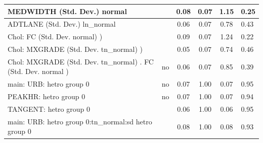 \begin{table}
\begin{center}
\begin{tabular}{|l|l|c|c|c|l|}
			\hline
			MEDWIDTH (Std. Dev.) normal &  & 0.08 & 0.07 & 1.15 & 0.25 \\
			\hline
			ADTLANE (Std. Dev.) ln_normal &  & 0.06 & 0.07 & 0.78 & 0.43 \\
			\hline
			 Chol: FC (Std. Dev. normal) ) &  & 0.09 & 0.07 & 1.24 & 0.22 \\
			\hline
			 Chol: MXGRADE (Std. Dev. tn_normal) ) &  & 0.05 & 0.07 & 0.74 & 0.46 \\
			\hline
			 Chol: MXGRADE (Std. Dev. tn_normal) . FC (Std. Dev.   normal ) & no & 0.06 & 0.07 & 0.85 & 0.39 \\
			\hline
			main: URB: hetro group 0 & no & 0.07 & 1.00 & 0.07 & 0.95 \\
			\hline
			PEAKHR: hetro group 0 & no & 0.07 & 1.00 & 0.07 & 0.94 \\
			\hline
			TANGENT: hetro group 0 &  & 0.06 & 1.00 & 0.06 & 0.95 \\
			\hline
			main: URB: hetro group 0:tn_normal:sd  hetro group 0 &  & 0.08 & 1.00 & 0.08 & 0.93 \\
			\hline
		\end{tabular}
	\end{center}
\end{table}